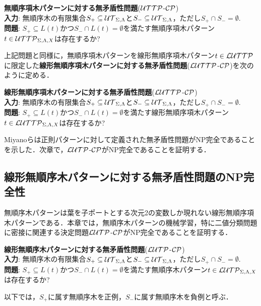\medskip
\noindent
\textbf{無順序項木パターンに対する無矛盾性問題}(${\cal UTTP}$-${\cal CP}$)\\
\textbf{入力}: 無順序木の有限集合$S_+\subseteq {\cal UT}_{\Sigma,\Lambda}$と$S_-\subseteq {\cal UT}_{\Sigma,\Lambda}$，ただし$S_+\cap S_-=\emptyset$.\\
\textbf{問題}: $S_+\subseteq L(t)$かつ$S_-\cap L(t)=\emptyset$を満たす無順序項木パターン$t\in {\cal UTTP}_{\Sigma,\Lambda,X}$は存在するか?
\medskip

上記問題と同様に，無順序項木パターンを線形無順序項木パターン$t\in {\cal LUTTP}$に限定した\textbf{線形無順序項木パターンに対する無矛盾性問題}(${\cal LUTTP}$-${\cal CP}$)を次のように定める．

\medskip
\noindent
\textbf{線形無順序項木パターンに対する無矛盾性問題}(${\cal LUTTP}$-${\cal CP}$)\\
\textbf{入力}: 無順序木の有限集合$S_+\subseteq {\cal UT}_{\Sigma,\Lambda}$と$S_-\subseteq {\cal UT}_{\Sigma,\Lambda}$，ただし$S_+\cap S_-=\emptyset$.\\
\textbf{問題}: $S_+\subseteq L(t)$かつ$S_-\cap L(t)=\emptyset$を満たす線形無順序項木パターン$t\in {\cal LUTTP}_{\Sigma,\Lambda,X}$は存在するか?
\medskip

Miyanoら\cite{miyano-ngc2000}は正則パターンに対して定義された無矛盾性問題がNP完全であることを示した．次章で，${\cal LUTP}$-${\cal CP}$がNP完全であることを証明する．

\subsection{線形無順序木パターンに対する無矛盾性問題のNP完全性}
無順序木パターンは葉を子ポートとする次元2の変数しか現れない線形無順序項木パターンである．本章では，無順序木パターンの機械学習，特に二値分類問題に密接に関連する決定問題${\cal LUTP}$-${\cal CP}$がNP完全であることを証明する．

\medskip
\noindent
\textbf{線形無順序木パターンに対する無矛盾性問題}(${\cal LUTP}$-${\cal CP}$)\\
\textbf{入力}: 無順序木の有限集合$S_+\subseteq {\cal UT}_{\Sigma,\Lambda}$と$S_-\subseteq {\cal UT}_{\Sigma,\Lambda}$，ただし$S_+\cap S_-=\emptyset$.\\
\textbf{問題}: $S_+\subseteq L(t)$かつ$S_-\cap L(t)=\emptyset$を満たす無順序木パターン$t\in {\cal LUTP}_{\Sigma,\Lambda,X}$は存在するか?

以下では，$S_+$に属す無順序木を正例，$S_-$に属す無順序木を負例と呼ぶ．
